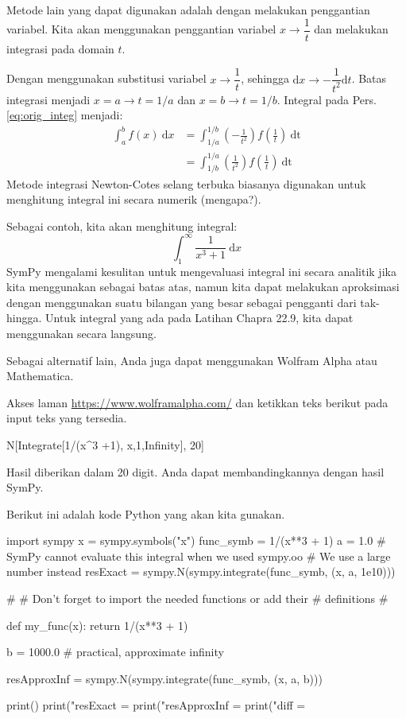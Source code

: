 Metode lain yang dapat digunakan adalah dengan melakukan penggantian variabel.
Kita akan menggunakan penggantian variabel $x \rightarrow \dfrac{1}{t}$ dan melakukan
integrasi pada domain $t$.

Dengan menggunakan substitusi variabel $x \rightarrow \dfrac{1}{t}$, sehingga
$\mathrm{d}x \rightarrow -\dfrac{1}{t^2} \mathrm{d}t$. Batas integrasi menjadi
$x=a \rightarrow t=1/a$ dan $x=b \rightarrow t=1/b$.
Integral pada Pers. \eqref{eq:orig_integ} menjadi:
\begin{align*}
\int_{a}^{b} f(x)\ \mathrm{d}x & = \int_{1/a}^{1/b}
\left( -\frac{1}{t^2} \right) f\left(\frac{1}{t}\right)\ \mathrm{dt} \\
& = \int_{1/b}^{1/a}
\left( \frac{1}{t^2} \right) f\left(\frac{1}{t}\right)\ \mathrm{dt}
\end{align*}
Metode integrasi Newton-Cotes selang terbuka biasanya digunakan
untuk menghitung integral ini secara numerik (mengapa?).

Sebagai contoh, kita akan menghitung integral:
\begin{equation}
\int_{1}^{\infty} \frac{1}{x^3 + 1}\ \mathrm{d}x
\end{equation}
SymPy mengalami kesulitan untuk mengevaluasi integral ini secara analitik
jika kita menggunakan  sebagai batas atas, namun kita
dapat melakukan aproksimasi dengan menggunakan suatu bilangan yang besar
sebagai pengganti dari tak-hingga. Untuk integral yang ada pada
Latihan Chapra 22.9, kita dapat menggunakan  secara
langsung.

Sebagai alternatif lain, Anda juga dapat menggunakan Wolfram Alpha
atau Mathematica.

Akses laman
{\scriptsize\url{https://www.wolframalpha.com/}} dan ketikkan teks
berikut pada input teks yang tersedia.
\begin{textcode}
N[Integrate[1/(x^3 +1), {x,1,Infinity}], 20]
\end{textcode}
Hasil diberikan dalam 20 digit. Anda dapat membandingkannya dengan hasil SymPy.

Berikut ini adalah kode Python yang akan kita gunakan.
\begin{pythoncode}
import sympy
x = sympy.symbols("x")
func_symb = 1/(x**3 + 1)
a = 1.0
# SymPy cannot evaluate this integral when we used sympy.oo
# We use a large number instead
resExact = sympy.N(sympy.integrate(func_symb, (x, a, 1e10)))

#
# Don't forget to import the needed functions or add their
# definitions
#

def my_func(x):
    return 1/(x**3 + 1)

b = 1000.0 # practical, approximate infinity

resApproxInf = sympy.N(sympy.integrate(func_symb, (x, a, b)))

print()
print("resExact     = %
print("resApproxInf = %
print("diff         = %
\end{pythoncode}

